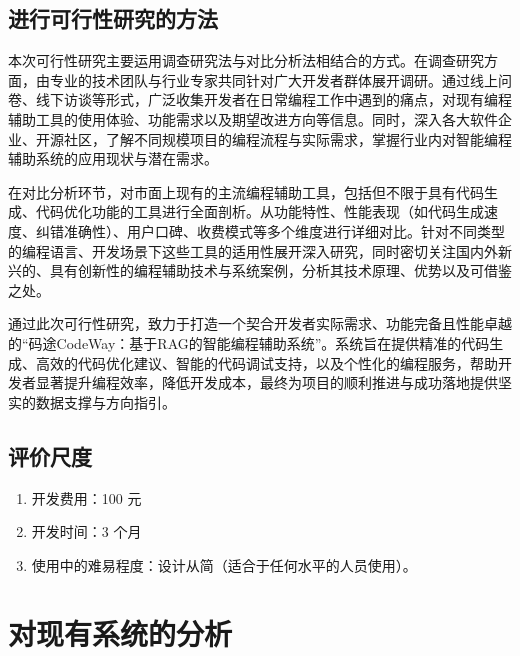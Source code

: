 \documentclass[
    report,     %
    oneside,    %
    UTF8,       %
    zihao=-4    %
]{config} %
\begin{document}
\subsection{进行可行性研究的方法}
本次可行性研究主要运用调查研究法与对比分析法相结合的方式。在调查研究方面，由专业的技术团队与行业专家共同针对广大开发者群体展开调研。通过线上问卷、线下访谈等形式，广泛收集开发者在日常编程工作中遇到的痛点，对现有编程辅助工具的使用体验、功能需求以及期望改进方向等信息。同时，深入各大软件企业、开源社区，了解不同规模项目的编程流程与实际需求，掌握行业内对智能编程辅助系统的应用现状与潜在需求。

在对比分析环节，对市面上现有的主流编程辅助工具，包括但不限于具有代码生成、代码优化功能的工具进行全面剖析。从功能特性、性能表现（如代码生成速度、纠错准确性）、用户口碑、收费模式等多个维度进行详细对比。针对不同类型的编程语言、开发场景下这些工具的适用性展开深入研究，同时密切关注国内外新兴的、具有创新性的编程辅助技术与系统案例，分析其技术原理、优势以及可借鉴之处。

通过此次可行性研究，致力于打造一个契合开发者实际需求、功能完备且性能卓越的“码途CodeWay：基于RAG的智能编程辅助系统”。系统旨在提供精准的代码生成、高效的代码优化建议、智能的代码调试支持，以及个性化的编程服务，帮助开发者显著提升编程效率，降低开发成本，最终为项目的顺利推进与成功落地提供坚实的数据支撑与方向指引。 

\subsection{评价尺度}
\begin{enumerate}[label=(\arabic*)]
    \item 开发费用：100 元
    \item 开发时间：3 个月
    \item 使用中的难易程度：设计从简（适合于任何水平的人员使用）。
\end{enumerate}
\newpage
\section{对现有系统的分析}
\end{document}
